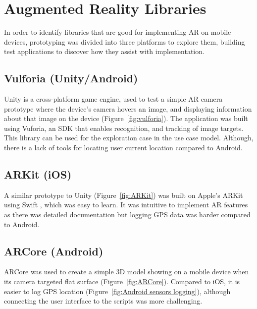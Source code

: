 
\section{Augmented Reality Libraries}
In order to identify libraries that are good for implementing AR on mobile devices, prototyping was divided into three platforms to explore them, building test applications to discover how they assist with implementation.

\subsection*{Vulforia (Unity/Android)}
Unity is a cross-platform game engine, used to test a simple AR camera prototype where the device's camera hovers an image, and displaying information about that image on the device (Figure~\ref{fig:vulforia}). The application was built using Vuforia, an SDK that enables recognition, and tracking of image targets. This library can be used for the exploration case in the use case model. Although, there is a lack of tools for locating user current location compared to Android.

\subsection*{ARKit (iOS)}
A similar prototype to Unity (Figure~\ref{fig:ARKit}) was built on Apple's ARKit using Swift \cite{applear}, which was easy to learn. It was intuitive to implement AR features as there was detailed documentation but logging GPS data was harder compared to Android.

\subsection*{ARCore (Android)}
ARCore was used to create a simple 3D model showing on a mobile device when its camera targeted flat surface (Figure~\ref{fig:ARCore}). Compared to iOS, it is easier to log GPS location (Figure~\ref{fig:Android sensors logging}), although connecting the user interface to the scripts was more challenging.


